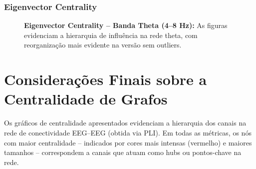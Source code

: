 \subsubsection{Eigenvector Centrality}
\begin{figure}[H]
    \centering
    \hfill
    \caption{\small \textbf{Eigenvector Centrality – Banda Theta (4--8 Hz):} As figuras evidenciam a hierarquia de influência na rede theta, com reorganização mais evidente na versão sem outliers.}
    \label{fig:eigenvector_theta}
\end{figure}

\section{Considerações Finais sobre a Centralidade de Grafos}
Os gráficos de centralidade apresentados evidenciam a hierarquia dos canais na rede de conectividade EEG–EEG (obtida via PLI). Em todas as métricas, os nós com maior centralidade – indicados por cores mais intensas (vermelho) e maiores tamanhos – correspondem a canais que atuam como hubs ou pontos-chave na rede. 

